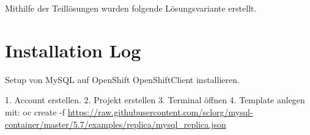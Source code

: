 Mithilfe der Teillösungen wurden folgende Lösungsvariante erstellt. 

\chapter{Installation Log}

Setup von MySQL auf OpenShift
OpenShiftClient installieren.

1. Account erstellen.
2. Projekt erstellen
3. Terminal öffnen
4. Template anlegen mit: oc create -f \url{https://raw.githubusercontent.com/sclorg/mysql-container/master/5.7/examples/replica/mysql_replica.json}

